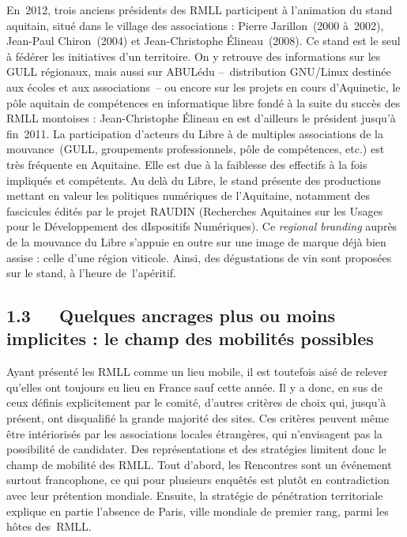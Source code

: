 \documentclass{FramateX}
\begin{document}
\begin{refsection}
En~2012, trois anciens présidents des RMLL participent à l'animation du
stand aquitain, situé dans le village des associations : Pierre
Jarillon~(2000 à~2002), Jean-Paul Chiron~(2004) et Jean-Christophe
Élineau~(2008). Ce stand est le seul à fédérer les initiatives d'un
territoire. On y retrouve des informations sur les GULL régionaux, mais
aussi sur ABULédu –~distribution
GNU/Linux destinée aux écoles et aux
associations~– ou
encore sur les projets en cours d'Aquinetic, le pôle aquitain de
compétences en informatique libre fondé à la suite du succès des RMLL
montoises : Jean-Christophe Élineau en est d'ailleurs le président
jusqu'à fin~2011. La participation d'acteurs du Libre à de multiples
associations de la mouvance~(GULL, groupements professionnels, pôle de
compétences, etc.) est très fréquente en Aquitaine. Elle est due à la
faiblesse des effectifs à la fois impliqués et compétents. Au delà du
Libre, le stand présente des productions mettant en valeur les
politiques numériques de l'Aquitaine, notamment des fascicules édités
par le projet RAUDIN (Recherches Aquitaines sur les Usages pour le
Développement des dIspositifs Numériques). Ce \textit{regional branding}
auprès de la mouvance du Libre s'appuie en outre sur une image de
marque déjà bien assise : celle d'une région viticole. Ainsi, des
dégustations de vin sont proposées sur le stand, à l'heure
de~l'apéritif.

\subsection*{1.3~~~Quelques ancrages plus ou moins implicites : le champ des mobilités possibles}
{}


Ayant présenté les RMLL comme un lieu mobile, il est toutefois aisé de
relever qu'elles ont toujours eu lieu en France sauf cette année. Il y
a donc, en sus de ceux définis explicitement par le comité, d'autres
critères de choix qui, jusqu'à présent, ont disqualifié la grande
majorité des sites. Ces critères peuvent même être intériorisés par les
associations locales étrangères, qui n'envisagent pas la possibilité de
candidater. Des représentations et des stratégies limitent donc le
champ de mobilité des RMLL. Tout d'abord, les Rencontres sont un
événement surtout francophone, ce qui pour plusieurs enquêtés est
plutôt en contradiction avec leur prétention mondiale. Ensuite, la
stratégie de pénétration territoriale explique en partie l'absence de
Paris, ville mondiale de premier rang, parmi les hôtes des~RMLL.


\end{refsection}
\end{document}
